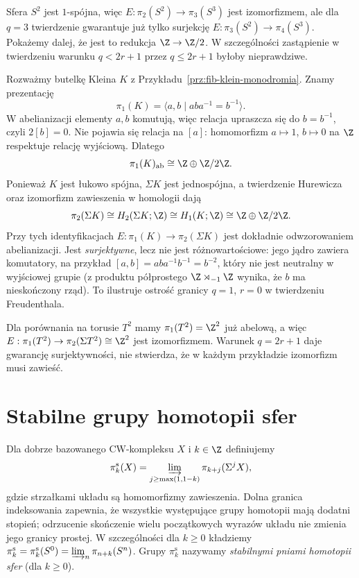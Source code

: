 \begin{przyklad}
Sfera $S^2$ jest $1$-spójna, więc
$E:\pi_2(S^2)\to\pi_3(S^3)$ jest izomorfizmem,
ale dla $q=3$ twierdzenie gwarantuje już tylko surjekcję
$E:\pi_3(S^2)\to\pi_4(S^3)$.
Pokażemy dalej, że jest to redukcja $\Z\to\Z/2$.
W szczególności zastąpienie w twierdzeniu
warunku $q<2r+1$ przez $q\le2r+1$
byłoby nieprawdziwe.
\end{przyklad}

\begin{przyklad}
\label{prz:freudenthal-klein-abel-v8}
Rozważmy butelkę Kleina $K$ z
Przykładu~\ref{prz:fib-klein-monodromia}.
Znamy prezentację
\[
 \pi_1(K)=\langle a,b\mid aba^{-1}=b^{-1}\rangle.
\]
W abelianizacji elementy $a,b$ komutują,
więc relacja upraszcza się do $b=b^{-1}$,
czyli $2[b]=0$.
Nie pojawia się relacja na $[a]$:
homomorfizm $a\mapsto1$, $b\mapsto0$
na $\Z$ respektuje relację wyjściową.
Dlatego
\[
 \pi_1(K)_{\mathrm{ab}}
 \cong\Z\oplus\Z/2\Z.
\]
Ponieważ $K$ jest łukowo spójna,
$\Sigma K$ jest jednospójna, a twierdzenie Hurewicza
oraz izomorfizm zawieszenia w homologii dają
\[
 \pi_2(\Sigma K)
 \cong H_2(\Sigma K;\Z)
 \cong H_1(K;\Z)
 \cong\Z\oplus\Z/2\Z.
\]
Przy tych identyfikacjach
$E:\pi_1(K)\to\pi_2(\Sigma K)$
jest dokładnie odwzorowaniem abelianizacji.
Jest \emph{surjektywne}, lecz nie jest różnowartościowe:
jego jądro zawiera komutatory, na przykład
$[a,b]=aba^{-1}b^{-1}=b^{-2}$,
który nie jest neutralny w wyjściowej grupie
(z produktu półprostego $\Z\rtimes_{-1}\Z$
wynika, że $b$ ma nieskończony rząd).
To ilustruje ostrość granicy $q=1$, $r=0$
w twierdzeniu Freudenthala.

Dla porównania na torusie $T^2$ mamy
$\pi_1(T^2)=\Z^2$ już abelową, a więc
$E:\pi_1(T^2)\to\pi_2(\Sigma T^2)\cong\Z^2$
jest izomorfizmem. Warunek
$q=2r+1$ daje gwarancję surjektywności,
nie stwierdza, że w każdym przykładzie
izomorfizm musi zawieść.
\end{przyklad}

\section{Stabilne grupy homotopii sfer}
\begin{definicja}
Dla dobrze bazowanego CW-kompleksu $X$ i $k\in\Z$
definiujemy
\[
\pi_k^{\mathrm s}(X)=
\varinjlim_{j\ge\max(1,1-k)}
\pi_{k+j}(\Sigma^jX),
\]
gdzie strzałkami układu są homomorfizmy zawieszenia.
Dolna granica indeksowania zapewnia, że wszystkie
występujące grupy homotopii mają dodatni stopień;
odrzucenie skończenie wielu początkowych wyrazów
układu nie zmienia jego granicy prostej.
W szczególności dla $k\ge0$ kładziemy
$\pi_k^{\mathrm s}=\pi_k^{\mathrm s}(S^0)
=\varinjlim_{n}\pi_{n+k}(S^n)$.
Grupy $\pi_k^{\mathrm s}$ nazywamy \emph{stabilnymi
pniami homotopii sfer} (dla $k\ge0$).
\end{definicja}

